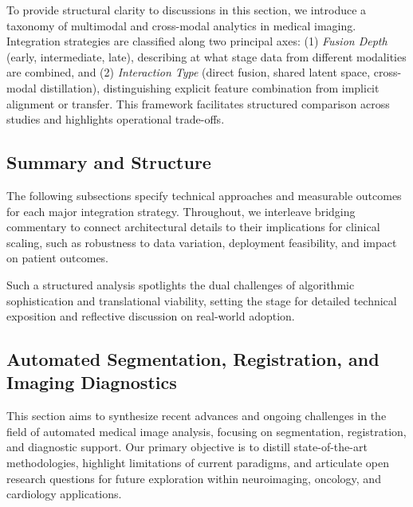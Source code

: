 \documentclass[sigconf]{acmart}
\begin{document}
To provide structural clarity to discussions in this section, we introduce a taxonomy of multimodal and cross-modal analytics in medical imaging. Integration strategies are classified along two principal axes: (1) \emph{Fusion Depth} (early, intermediate, late), describing at what stage data from different modalities are combined, and (2) \emph{Interaction Type} (direct fusion, shared latent space, cross-modal distillation), distinguishing explicit feature combination from implicit alignment or transfer. This framework facilitates structured comparison across studies and highlights operational trade-offs.

\subsection*{Summary and Structure}

The following subsections specify technical approaches and measurable outcomes for each major integration strategy. Throughout, we interleave bridging commentary to connect architectural details to their implications for clinical scaling, such as robustness to data variation, deployment feasibility, and impact on patient outcomes.

Such a structured analysis spotlights the dual challenges of algorithmic sophistication and translational viability, setting the stage for detailed technical exposition and reflective discussion on real-world adoption.

\subsection{Automated Segmentation, Registration, and Imaging Diagnostics}

This section aims to synthesize recent advances and ongoing challenges in the field of automated medical image analysis, focusing on segmentation, registration, and diagnostic support. Our primary objective is to distill state-of-the-art methodologies, highlight limitations of current paradigms, and articulate open research questions for future exploration within neuroimaging, oncology, and cardiology applications.
\end{document}
